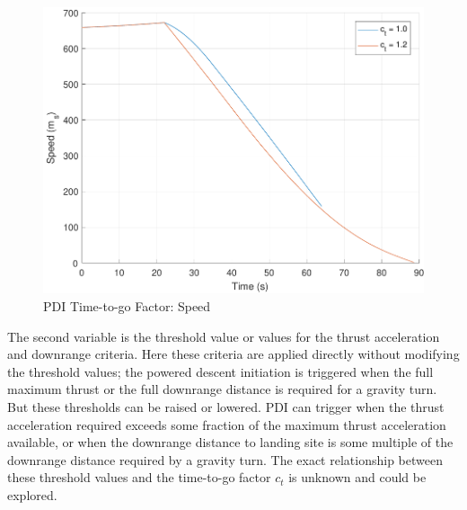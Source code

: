 \begin{figure}[H]
	\centering
	\begin{minipage}{4.3 in}
		\includegraphics[width=\linewidth]{Figures/spdtgofac.pdf}
		\caption{PDI Time-to-go Factor: Speed \label{fig:spdtgofac} }
	\end{minipage}
\end{figure}



The second variable is the threshold value or values for the thrust acceleration and downrange criteria. Here these criteria are applied directly without modifying the threshold values; the powered descent initiation is triggered when the full maximum thrust or the full downrange distance is required for a gravity turn. But these thresholds can be raised or lowered. PDI can trigger when the thrust acceleration required exceeds some fraction of the maximum thrust acceleration available, or when the downrange distance to landing site is some multiple of the downrange distance required by a gravity turn. The exact relationship between these threshold values and the time-to-go factor $c_t$ is unknown and could be explored. 


